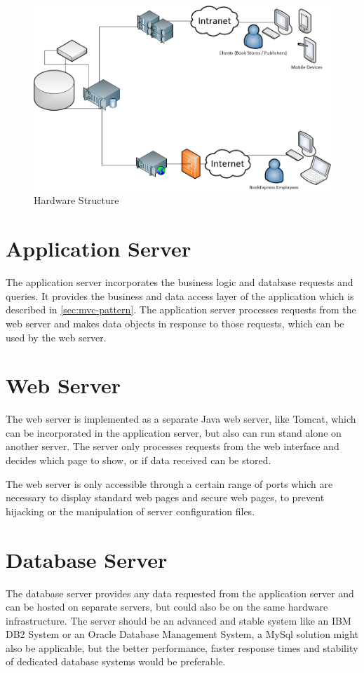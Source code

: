 \documentclass[11pt,a4paper,oneside,svgnames]{report}
\begin{document}
\begin{figure}[H]
 \begin{center}
  \includegraphics[width=\textwidth]{Hardware Structure.png}
 \end{center}
 \caption{Hardware Structure}
\end{figure}

\section{Application Server}
The application server incorporates the business logic and database requests and queries. It provides the business and data access layer of the application which is described in \ref{sec:mvc-pattern}. The application server processes requests from the web server and makes data objects in response to those requests, which can be used by the web server.

\section{Web Server}
The web server is implemented as a separate Java web server, like Tomcat, which can be incorporated in the application server, but also can run stand alone on another server. The server only processes requests from the web interface and decides which page to show, or if data received can be stored.

The web server is only accessible through a certain range of ports which are necessary to display standard web pages and secure web pages, to prevent hijacking or the manipulation of server configuration files.

\section{Database Server}
The database server provides any data requested from the application server and can be hosted on separate servers, but could also be on the same hardware infrastructure. The server should be an advanced and stable system like an IBM DB2 System or an Oracle Database Management System, a MySql solution might also be applicable, but the better performance, faster response times and stability of dedicated database systems would be preferable.
\end{document}
